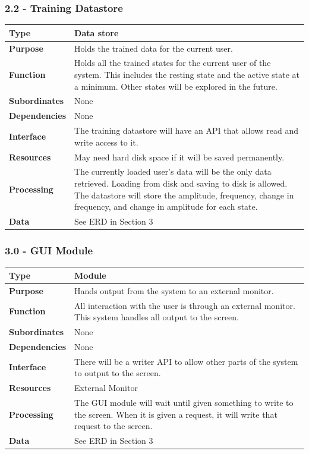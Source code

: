 \documentclass{article}
\begin{document}
\subsubsection*{2.2 - Training Datastore}
\begin{tabular}{ | l |  p{13.3cm} |}
\hline
\textbf{Type} & Data store \\ \hline
\textbf{Purpose} & Holds the trained data for the current user. \\ \hline
\textbf{Function} & Holds all the trained states for the current user of the system. This includes the resting state and the active state at a minimum. Other states will be explored in the future. \\ \hline
\textbf{Subordinates} & None \\ \hline
\textbf{Dependencies} & None \\ \hline
\textbf{Interface} & The training datastore will have an API that allows read and write access to it. \\ \hline
\textbf{Resources} & May need hard disk space if it will be saved permanently.  \\ \hline
\textbf{Processing} & The currently loaded user's data will be the only data retrieved. Loading from disk and saving to disk is allowed. The datastore will store the amplitude, frequency, change in frequency, and change in amplitude for each state.\\ \hline
\textbf{Data} & See ERD in Section 3 \\ \hline
\end{tabular}

\subsubsection*{3.0 - GUI Module}
\begin{tabular}{ | l |  p{13.3cm} |}
\hline
\textbf{Type} & Module \\ \hline
\textbf{Purpose} & Hands output from the system to an external monitor. \\ \hline
\textbf{Function} & All interaction with the user is through an external monitor. This system handles all output to the screen. \\ \hline
\textbf{Subordinates} & None \\ \hline
\textbf{Dependencies} & None \\ \hline
\textbf{Interface} & There will be a writer API to allow other parts of the system to output to the screen. \\ \hline
\textbf{Resources} & External Monitor \\ \hline
\textbf{Processing} & The GUI module will wait until given something to write to the screen. When it is given a request, it will write that request to the screen. \\ \hline
\textbf{Data} & See ERD in Section 3 \\ \hline
\end{tabular}
\end{document}
